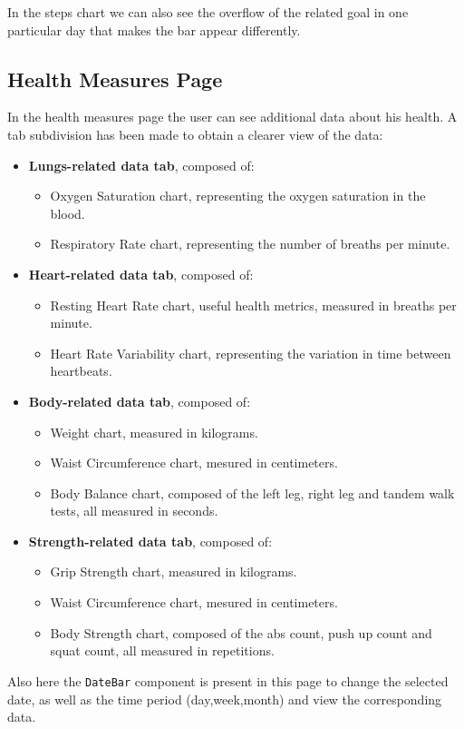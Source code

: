 \noindent In the steps chart we can also see the overflow of the related goal in one particular day that makes the bar appear differently.

\subsection{Health Measures Page}
In the health measures page the user can see additional data about his health. \newline A tab subdivision has been made to obtain a clearer view of the data:
\begin{itemize}[nosep] %
    \item \textbf{Lungs-related data tab}, composed of:
    \begin{itemize}[nosep]
        \item Oxygen Saturation chart, representing the oxygen saturation in the blood.
        \item Respiratory Rate chart, representing the number of breaths per minute.
    \end{itemize}
    \item \textbf{Heart-related data tab}, composed of:
    \begin{itemize}[nosep]
        \item Resting Heart Rate chart, useful health metrics, measured in breaths per minute.
        \item Heart Rate Variability chart, representing the variation in time between heartbeats.
    \end{itemize}
    \item \textbf{Body-related data tab}, composed of:
    \begin{itemize}[nosep]
        \item Weight chart, measured in kilograms.
        \item Waist Circumference chart, mesured in centimeters.
        \item Body Balance chart, composed of the left leg, right leg and tandem walk tests, all measured in seconds.
    \end{itemize}
    \item \textbf{Strength-related data tab}, composed of:
    \begin{itemize}[nosep]
        \item Grip Strength chart, measured in kilograms.
        \item Waist Circumference chart, mesured in centimeters.
        \item Body Strength chart, composed of the abs count, push up count and squat count, all measured in repetitions.
    \end{itemize}
\end{itemize}
Also here the \texttt{DateBar} component is present in this page to change the selected date, as well as the time period (day,week,month) and view the corresponding data.
